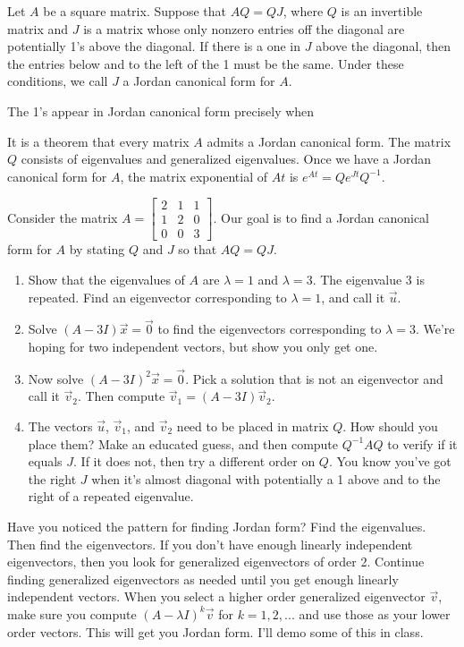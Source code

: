 \begin{definition}
 Let $A$ be a square matrix. Suppose that $AQ=QJ$, where $Q$ is an invertible matrix and $J$ is a matrix whose only nonzero entries off the diagonal are potentially 1's above the diagonal.  If there is a one in $J$ above the diagonal, then the entries below and to the left of the 1 must be the same. Under these conditions, we call $J$ a Jordan canonical form for $A$.  

 The 1's appear in Jordan canonical form precisely when 
\end{definition}

It is a theorem that every matrix $A$ admits a Jordan canonical form.  The matrix $Q$ consists of eigenvalues and generalized eigenvalues.  Once we have a Jordan canonical form for $A$, the matrix exponential of $At$ is $e^{At} = Q e^{Jt} Q^{-1}$.  

\begin{problem}
Consider the matrix 
$A =
\begin{bmatrix}
 2&1&1\\
 1&2&0\\
 0&0&3
\end{bmatrix}
.$ 
Our goal is to find a Jordan canonical form for $A$ by stating $Q$ and $J$ so that $AQ=QJ$.   
\begin{enumerate}
 \item Show that the eigenvalues of $A$ are $\lambda = 1$ and $\lambda =3$.  The eigenvalue 3 is repeated. Find an eigenvector corresponding to $\lambda =1$, and call it $\vec u$. 
 \item Solve $(A-3I)\vec x=\vec 0$ to find the eigenvectors corresponding to $\lambda = 3$. We're hoping for two independent vectors, but show you only get one.
 \item Now solve $(A-3I)^2\vec x=\vec 0$. Pick a solution that is not an eigenvector and call it $\vec v_2$.  Then compute $\vec v_1 = (A-3 I)\vec v_2.$ 
 \item The vectors $\vec u$, $\vec v_1$, and $\vec v_2$ need to be placed in matrix $Q$. How should you place them?  Make an educated guess, and then compute $Q^{-1}AQ$ to verify if it equals $J$.  If it does not, then try a different order on $Q$. You know you've got the right $J$ when it's almost diagonal with potentially a 1 above and to the right of a repeated eigenvalue. 
\end{enumerate}
\end{problem}

Have you noticed the pattern for finding Jordan form?  Find the eigenvalues. Then find the eigenvectors.  If you don't have enough linearly independent eigenvectors, then you look for generalized eigenvectors of order 2. Continue finding generalized eigenvectors as needed until you get enough linearly independent vectors.  When you select a higher order generalized eigenvector $\vec v$, make sure you compute $(A-\lambda I)^k\vec v$ for $k=1,2,...$ and use those as your lower order vectors.  This will get you Jordan form.  I'll  demo some of this in class.


